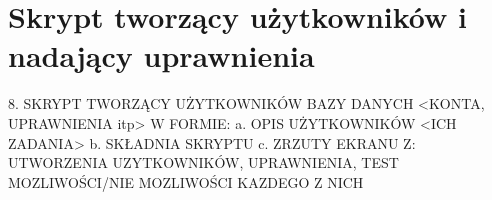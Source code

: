 \section{Skrypt tworzący użytkowników i nadający uprawnienia}

8. SKRYPT TWORZĄCY UŻYTKOWNIKÓW BAZY DANYCH <KONTA, UPRAWNIENIA itp>
W FORMIE:
a. OPIS UŻYTKOWNIKÓW <ICH ZADANIA>
b. SKŁADNIA SKRYPTU
c. ZRZUTY EKRANU Z: UTWORZENIA UZYTKOWNIKÓW, UPRAWNIENIA, TEST
MOZLIWOŚCI/NIE MOZLIWOŚCI KAZDEGO Z NICH